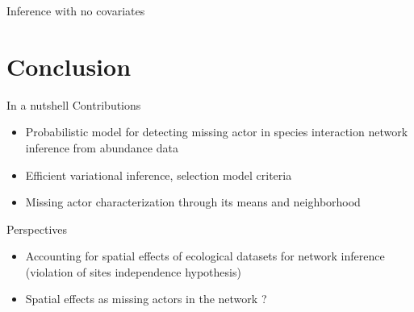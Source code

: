 \documentclass[11pt]{beamer}
\newcommand{\bleu}[1]{\textcolor{Framableulight}{#1}}
\begin{document}
\begin{frame}{Inference with no covariates}

 \begin{center}
 \end{center}
 
\end{frame}
\section{Conclusion}
\begin{frame}{In a nutshell}
\bleu{Contributions}
\begin{itemize}
\item Probabilistic model for detecting missing actor in species interaction network inference from abundance data
\item Efficient variational inference, selection model criteria
\item Missing actor characterization through its means and neighborhood \\
\end{itemize}
\bigskip

\bleu{Perspectives}
\begin{itemize}
\item Accounting for spatial effects of ecological datasets for network inference (violation of sites independence hypothesis)
\item Spatial effects as missing actors in the network ?
\end{itemize}
\end{frame}
\end{document}
